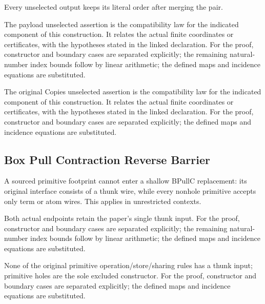 Every unselected output keeps its literal order after merging the pair.
\par{}

The payload unselected assertion is the compatibility law for the indicated component of this construction. It relates the actual finite coordinates or certificates, with the hypotheses stated in the linked declaration.
For the proof, constructor and boundary cases are separated explicitly; the remaining natural-number index bounds follow by linear arithmetic; the defined maps and incidence equations are substituted.
\par{}

The original Copies unselected assertion is the compatibility law for the indicated component of this construction. It relates the actual finite coordinates or certificates, with the hypotheses stated in the linked declaration.
For the proof, constructor and boundary cases are separated explicitly; the defined maps and incidence equations are substituted.
\par{}

\subsection{Box Pull Contraction Reverse Barrier}
A sourced primitive footprint cannot enter a shallow BPullC replacement: its original interface consists of a thunk wire, while every nonhole primitive accepts only term or atom wires. This applies in unrestricted contexts.

Both actual endpoints retain the paper's single thunk input.
For the proof, constructor and boundary cases are separated explicitly; the remaining natural-number index bounds follow by linear arithmetic; the defined maps and incidence equations are substituted.
\par{}

None of the original primitive operation/store/sharing rules has a thunk input; primitive holes are the sole excluded constructor.
For the proof, constructor and boundary cases are separated explicitly; the defined maps and incidence equations are substituted.
\par{}

